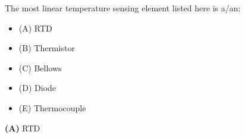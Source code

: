 

The most linear temperature sensing element listed here is a/an:

\begin{itemize}
\item{(A)} RTD
\vskip 5pt 
\item{(B)} Thermistor
\vskip 5pt 
\item{(C)} Bellows
\vskip 5pt 
\item{(D)} Diode
\vskip 5pt 
\item{(E)} Thermocouple
\end{itemize}







{\bf (A)} RTD
 









